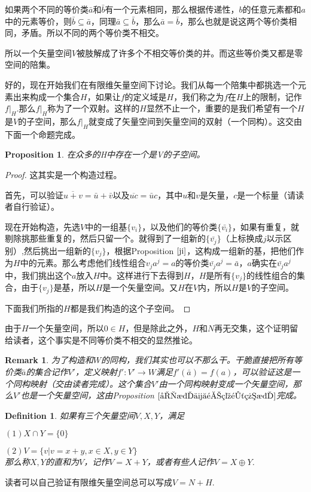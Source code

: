 \documentclass[11pt,a4paper,openany]{book}%
\theoremstyle{plain}%
\newtheorem{pro}{Proposition}[chapter]%
\newtheorem*{rem}{Remark}%
\newtheorem{defi}{Definition}[chapter]%
\newcommand{\NO}[1]{{$(#1)$}}%
\newcommand{\pref}[1]{{\rm Proposition} $\ref{#1}$}
\begin{document}
如果两个不同的等价类$\bar{a}$和$\bar{b}$有一个元素相同，那么根据传递性，$b$的任意元素都和$a$中的元素等价，则$\bar{b}\subseteq \bar{a}$，同理$\bar{a}\subseteq \bar{b}$，那么$\bar{a}=\bar{b}$，那么也就是说这两个等价类相同，矛盾。所以不同的两个等价类不相交。

所以一个矢量空间$V$被肢解成了许多个不相交等价类的并。而这些等价类又都是零空间的陪集。

好的，现在开始我们在有限维矢量空间下讨论。我们从每一个陪集中都挑选一个元素出来构成一个集合$H$，如果让$f$的定义域是$H$，我们称之为$f$在$H$上的限制，记作$f|_H$.那么$f|_H$称为了一个双射。这样的$H$显然不止一个，重要的是我们希望有一个$H$是$V$的子空间，那么$f|_H$就变成了矢量空间到矢量空间的双射（一个同构）。这交由下面一个命题完成。
\begin{pro}
在众多的H中存在一个是V的子空间。
\label{a-1}
\end{pro}
\begin{proof}
这其实是一个构造过程。

首先，可以验证$\overline{u+v}=\bar{u}+\bar{v}$以及$\overline{uc}=\bar{u}c$，其中$u$和$v$是矢量，$c$是一个标量（请读者自行验证）。

现在开始构造，先选$V$中的一组基$\{v_i\}$，以及他们的等价类$\{\bar{v_i}\}$，如果有重复，就剔除挑那些重复的，然后只留一个。就得到了一组新的$\{\bar{v_j}\}$（上标换成$j$以示区别）,然后挑出一组新的$\{v_j\}$，根据\pref{ji}，这构成一组新的基，把他们作为$H$中的元素。那么考虑他们线性组合$v_ja^j=a$的等价类$\bar{v_j}a^j=\bar{a}$，$a$确实在$\bar{v_j}a^j$中，我们挑出这个$a$放入$H$中。这样进行下去得到$H$，$H$是所有$\{v_j\}$的线性组合的集合，由于$\{v_j\}$是基，所以$H$是一个矢量空间。又$H$在$V$内，所以$H$是$V$的子空间。

下面我们所指的$H$都是我们构造的这个子空间。
\end{proof}
由于$H$一个矢量空间，所以$0 \in H$，但是除此之外，$H$和$N$再无交集，这个证明留给读者，这个事实是不同等价类不相交的显然推论。
\begin{rem}
为了构造和$W$的同构，我们其实也可以不那么干。干脆直接把所有等价类$\bar{a}$的集合记作$V'$，定义映射$f':V'\rightarrow W$满足$f'(\bar{a})=f(a)$，可以验证这是一个同构映射（交由读者完成）。这个集合$V'$由一个同构映射变成一个矢量空间，那么$V'$也是一个矢量空间，这由\pref{同构传递空间结构}完成。
\end{rem}
\begin{defi}
如果有三个矢量空间$V,X,Y$，满足

\NO{1}$X\cap Y=\{0\}$

\NO{2}$V=\{v|v=x+y,x\in X,y \in Y\}$\\
那么称$X,Y$的直和为$V$，记作$V=X+Y$，或者有些人记作$V=X\oplus Y$.
\end{defi}
读者可以自己验证有限维矢量空间总可以写成$V=N+H$.
\end{document}
